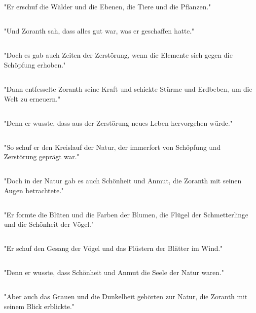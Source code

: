 \documentclass{article}
\begin{document}
\subsection{}
"Er erschuf die Wälder und die Ebenen, die Tiere und die Pflanzen."
\subsection{}
"Und Zoranth sah, dass alles gut war, was er geschaffen hatte."
\subsection{}
"Doch es gab auch Zeiten der Zerstörung, wenn die Elemente sich gegen die Schöpfung erhoben."
\subsection{}
"Dann entfesselte Zoranth seine Kraft und schickte Stürme und Erdbeben, um die Welt zu erneuern."
\subsection{}
"Denn er wusste, dass aus der Zerstörung neues Leben hervorgehen würde."
\subsection{}
"So schuf er den Kreislauf der Natur, der immerfort von Schöpfung und Zerstörung geprägt war."
\subsection{}
"Doch in der Natur gab es auch Schönheit und Anmut, die Zoranth mit seinen Augen betrachtete."
\subsection{}
"Er formte die Blüten und die Farben der Blumen, die Flügel der Schmetterlinge und die Schönheit der Vögel."
\subsection{}
"Er schuf den Gesang der Vögel und das Flüstern der Blätter im Wind."
\subsection{}
"Denn er wusste, dass Schönheit und Anmut die Seele der Natur waren."
\subsection{}
"Aber auch das Grauen und die Dunkelheit gehörten zur Natur, die Zoranth mit seinem Blick erblickte."
\end{document}
